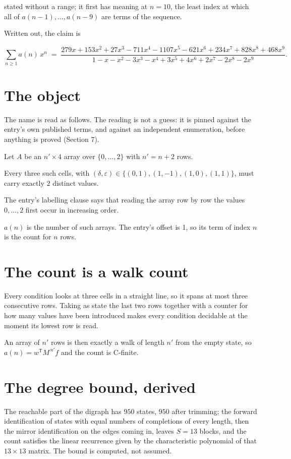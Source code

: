 \documentclass[11pt]{article}
\theoremstyle{definition}
\begin{document}
stated without a range; it first has meaning at $n = 10$, the least index at which all of $a(n-1),\dots,a(n-9)$ are terms of the sequence.

Written out, the claim is

\[\sum_{n \ge 1} a(n)\,x^n \;=\; \frac{279x + 153x^{2} + 27x^{3} - 711x^{4} - 1107x^{5} - 621x^{6} + 234x^{7} + 828x^{8} + 468x^{9}}{1 - x - x^{2} - 3x^{3} - x^{4} + 3x^{5} + 4x^{6} + 2x^{7} - 2x^{8} - 2x^{9}}.\]

\section{The object}

The name is read as follows. The reading is not a guess: it is pinned against the entry's own published terms, and against an independent enumeration, before anything is proved (Section 7).

Let $A$ be an $n' \times 4$ array over $\{0,\dots,2\}$ with $n' = n + 2$ rows.

Every three such cells, with $(\delta,\varepsilon) \in \{(0,1), (1,-1), (1,0), (1,1)\}$, must carry exactly $2$ distinct values.

The entry's labelling clause says that reading the array row by row the values $0,\dots,2$ first occur in increasing order.

$a(n)$ is the number of such arrays. The entry's offset is 1, so its term of index $n$ is the count for $n$ rows.

\section{The count is a walk count}

Every condition looks at three cells in a straight line, so it spans at most three consecutive rows. Taking as state the last two rows together with a counter for how many values have been introduced makes every condition decidable at the moment its lowest row is read.

An array of $n'$ rows is then exactly a walk of length $n'$ from the empty state, so $a(n) = w^{\mathsf T}M^{\,n'}f$ and the count is C-finite.

\section{The degree bound, derived}

The reachable part of the digraph has $950$ states, $950$ after trimming; the forward identification of states with equal numbers of completions of every length, then the mirror identification on the edges coming in, leaves $S = 13$ blocks, and the count satisfies the linear recurrence given by the characteristic polynomial of that $13\times13$ matrix. The bound is computed, not assumed.
\end{document}
